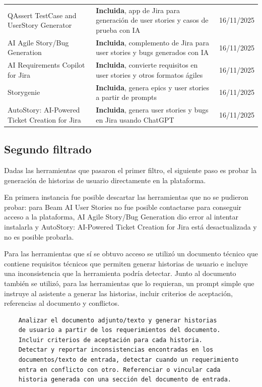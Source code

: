 \begin{center}
\begin{longtable}{|p{7cm}|p{4cm}|p{1.8cm}|}
QAssert TestCase and UserStory Generator & \textbf{Incluida}, app de Jira para generación de user stories y casos de prueba con IA & 16/11/2025 \\
AI Agile Story/Bug Generation & \textbf{Incluida}, complemento de Jira para user stories y bugs generados con IA & 16/11/2025 \\
AI Requirements Copilot for Jira & \textbf{Incluida}, convierte requisitos en user stories y otros formatos ágiles & 16/11/2025 \\
Storygenie & \textbf{Incluida}, genera epics y user stories a partir de prompts & 16/11/2025 \\
AutoStory: AI-Powered Ticket Creation for Jira & \textbf{Incluida}, genera user stories y bugs en Jira usando ChatGPT & 16/11/2025 \\
\hline
\end{longtable}
\end{center}

\subsection{Segundo filtrado}
Dadas las herramientas que pasaron el primer filtro, el siguiente paso es probar la generación de historias de usuario directamente en la plataforma.

En primera instancia fue posible descartar las herramientas que no se pudieron probar: para Beam AI User Stories no fue posible contactarse para conseguir acceso a la plataforma, AI Agile Story/Bug Generation dio error al intentar instalarla y AutoStory: AI-Powered Ticket Creation for Jira está desactualizada y no es posible probarla.

Para las herramientas que sí se obtuvo acceso se utilizó un documento técnico que contiene requisitos técnicos que permiten generar historias de usuario e incluye una inconsistencia que la herramienta podría detectar. Junto al documento también se utilizó, para las herramientas que lo requieran, un prompt simple que instruye al asistente a generar las historias, incluir criterios de aceptación, referencias al documento y conflictos.

\begin{verbatim}
    Analizar el documento adjunto/texto y generar historias
    de usuario a partir de los requerimientos del documento.
    Incluir criterios de aceptación para cada historia.
    Detectar y reportar inconsistencias encontradas en los
    documentos/texto de entrada, detectar cuando un requerimiento
    entra en conflicto con otro. Referenciar o vincular cada
    historia generada con una sección del documento de entrada.
\end{verbatim}

